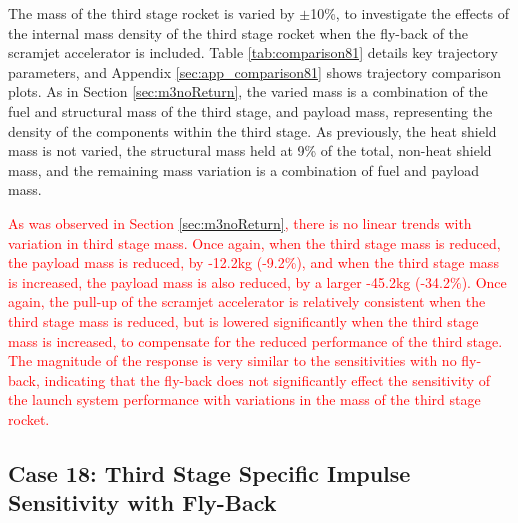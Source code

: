 The mass of the third stage rocket is varied by $\pm$10\%, to investigate the effects of the internal mass density of the third stage rocket when the fly-back of the scramjet accelerator is included. Table \ref{tab:comparison81} details key trajectory parameters, and Appendix \ref{sec:app_comparison81} shows trajectory comparison plots. As in Section \ref{sec:m3noReturn}, the varied mass is a combination of the fuel and structural mass of the third stage, and payload mass, representing the density of the components within the third stage. As previously, the heat shield mass is not varied, the structural mass held at 9\% of the total, non-heat shield mass, and the remaining mass variation is a combination of fuel and payload mass.

\textcolor{red}{
As was observed in Section \ref{sec:m3noReturn}, there is no linear trends with variation in third stage mass. Once again, when the third stage mass is reduced, the payload mass is reduced, by -12.2kg (-9.2\%), and when the third stage mass is increased, the payload mass is also reduced, by a larger -45.2kg (-34.2\%). Once again, the pull-up of the scramjet accelerator is relatively consistent when the third stage mass is reduced, but is lowered significantly when the third stage mass is increased, to compensate for the reduced performance of the third stage. The magnitude of the response is very similar to the sensitivities with no fly-back, indicating that the fly-back does not significantly effect the sensitivity of the launch system performance with variations in the mass of the third stage rocket. 
}


\subsection{Case 18: Third Stage Specific Impulse Sensitivity with Fly-Back}


